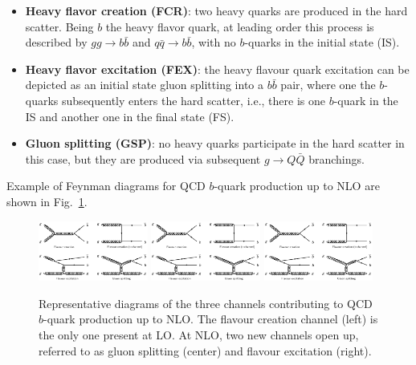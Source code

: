 \begin{itemize}\addtolength{\itemsep}{-0.4\baselineskip}
\item
{\bf Heavy flavor creation (FCR)}: two heavy quarks are produced in the hard scatter. Being $b$ the heavy flavor quark, at leading order this process is described by $gg \rightarrow b\bar{b}$ and  $q\bar{q} \rightarrow b\bar{b}$, with no $b$-quarks in the initial state (IS).
\item
{\bf Heavy flavor excitation (FEX)}: the heavy flavour quark excitation can be depicted as an initial state gluon splitting into a $b\bar{b}$ pair, where one the $b$-quarks subsequently enters the hard scatter, i.e., there is one $b$-quark in the IS and another one in the final state (FS).
\item
{\bf Gluon splitting (GSP)}: no heavy quarks participate in the hard scatter in this case, but they are produced via subsequent $g \rightarrow Q\bar{Q}$ branchings. %
\end{itemize}

Example of Feynman diagrams for QCD $b$-quark production up to NLO are shown in Fig.~\ref{fig:qcd_diagrams}.

%
\begin{figure}[h!]
\centering
\includegraphics[width=0.32\textwidth,viewport=0 880 1500 1600,clip]{FIGS/bb_diagrams.jpg}
\includegraphics[width=0.32\textwidth,viewport=1600 0 3100 820,clip]{FIGS/bb_diagrams.jpg}
\includegraphics[width=0.32\textwidth,viewport=0 0 1500 820,clip]{FIGS/bb_diagrams.jpg}
\caption{Representative diagrams of the three channels contributing to QCD $b$-quark production up to NLO. The flavour creation channel (left) is the only one present at LO. At NLO, two new channels open up, referred to as gluon splitting (center) and  flavour excitation (right).}
\label{fig:qcd_diagrams}
\end{figure}
%

